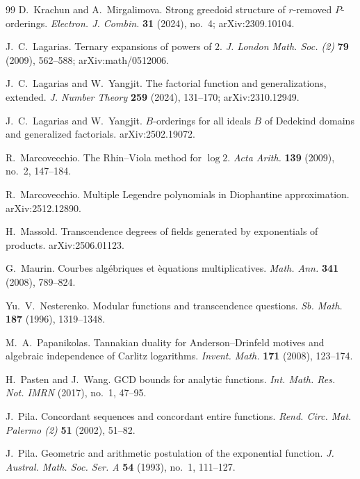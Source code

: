 \documentclass[10pt,letterpaper]{article}
\begin{document}
\begin{thebibliography}{99}
D.~Krachun and A.~Mirgalimova.
\newblock Strong greedoid structure of $r$-removed $P$-orderings.
\newblock \emph{Electron. J. Combin.} \textbf{31} (2024), no.~4; arXiv:2309.10104.

J.~C.~Lagarias.
\newblock Ternary expansions of powers of $2$.
\newblock \emph{J. London Math. Soc. (2)} \textbf{79} (2009), 562--588; arXiv:math/0512006.

J.~C.~Lagarias and W.~Yangjit.
\newblock The factorial function and generalizations, extended.
\newblock \emph{J. Number Theory} \textbf{259} (2024), 131--170; arXiv:2310.12949.

J.~C.~Lagarias and W.~Yangjit.
\newblock $B$-orderings for all ideals $B$ of Dedekind domains and generalized factorials.
\newblock arXiv:2502.19072.

R.~Marcovecchio.
\newblock The Rhin--Viola method for $\log 2$.
\newblock \emph{Acta Arith.} \textbf{139} (2009), no.~2, 147--184.

R.~Marcovecchio.
\newblock Multiple Legendre polynomials in Diophantine approximation.
\newblock arXiv:2512.12890.

H.~Massold.
\newblock Transcendence degrees of fields generated by exponentials of products.
\newblock arXiv:2506.01123.

G.~Maurin.
\newblock Courbes alg\'ebriques et \`equations multiplicatives.
\newblock \emph{Math. Ann.} \textbf{341} (2008), 789--824.

Yu.~V.~Nesterenko.
\newblock Modular functions and transcendence questions.
\newblock \emph{Sb. Math.} \textbf{187} (1996), 1319--1348.

M.~A.~Papanikolas.
\newblock Tannakian duality for Anderson--Drinfeld motives and algebraic independence of Carlitz logarithms.
\newblock \emph{Invent. Math.} \textbf{171} (2008), 123--174.

H.~Pasten and J.~Wang.
\newblock GCD bounds for analytic functions.
\newblock \emph{Int. Math. Res. Not. IMRN} (2017), no.~1, 47--95.

J.~Pila.
\newblock Concordant sequences and concordant entire functions.
\newblock \emph{Rend. Circ. Mat. Palermo (2)} \textbf{51} (2002), 51--82.

J.~Pila.
\newblock Geometric and arithmetic postulation of the exponential function.
\newblock \emph{J. Austral. Math. Soc. Ser. A} \textbf{54} (1993), no.~1, 111--127.


\end{thebibliography}
\end{document}
